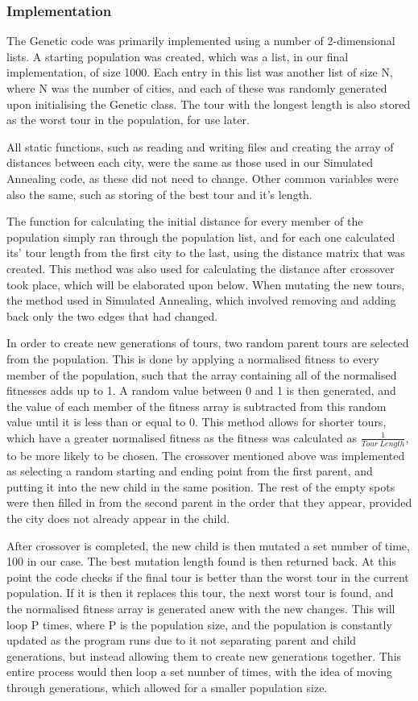 \documentclass[11pt]{article}
\begin{document}
		\subsubsection*{Implementation}
		The Genetic code was primarily implemented using a number of 2-dimensional lists. A starting population was created, which was a list, in our final implementation, of size 1000. Each entry in this list was another list of size N, where N was the number of cities, and each of these was randomly generated upon initialising the Genetic class. The tour with the longest length is also stored as the worst tour in the population, for use later.
		\par
		All static functions, such as reading and writing files and creating the array of distances between each city, were the same as those used in our Simulated Annealing code, as these did not need to change. Other common variables were also the same, such as storing of the best tour and it's length.
		\par 
		The function for calculating the initial distance for every member of the population simply ran through the population list, and for each one calculated its' tour length from the first city to the last, using the distance matrix that was created. This method was also used for calculating the distance after crossover took place, which will be elaborated upon below. When mutating the new tours, the method used in Simulated Annealing, which involved removing and adding back only the two edges that had changed.
		\par 
		In order to create new generations of tours, two random parent tours are selected from the population. This is done by applying a normalised fitness to every member of the population, such that the array containing all of the normalised fitnesses adds up to 1. A random value between 0 and 1 is then generated, and the value of each member of the fitness array is subtracted from this random value until it is less than or equal to 0. This method allows for shorter tours, which have a greater normalised fitness as the fitness was calculated as $ \frac{1}{Tour\ Length} $, to be more likely to be chosen. The crossover mentioned above was implemented as selecting a random starting and ending point from the first parent, and putting it into the new child in the same position. The rest of the empty spots were then filled in from the second parent in the order that they appear, provided the city does not already appear in the child.
		\par 
		After crossover is completed, the new child is then mutated a set number of time, 100 in our case. The best mutation length found is then returned back. At this point the code checks if the final tour is better than the worst tour in the current population. If it is then it replaces this tour, the next worst tour is found, and the normalised fitness array is generated anew with the new changes. This will loop P times, where P is the population size, and the population is constantly updated as the program runs due to it not separating parent and child generations, but instead allowing them to create new generations together. This entire process would then loop a set number of times, with the idea of moving through generations, which allowed for a smaller population size.
\end{document}
